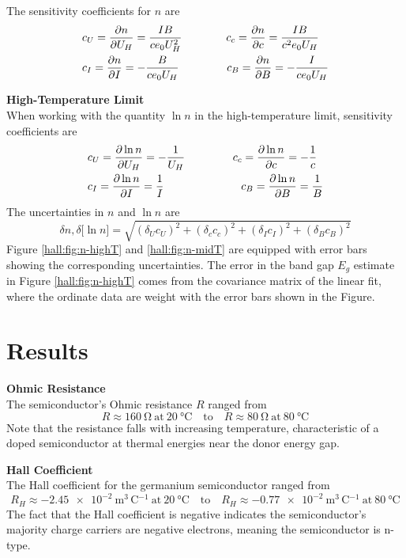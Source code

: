\documentclass[11pt, a4paper]{article}
\begin{document}
\vspace{2mm}
The sensitivity coefficients for $ n $ are
\begin{align*}
	&c_{U} = \pdv{n}{U_{H}} = \frac{IB}{ce_{0}U_{H}^{2}} \qquad \qquad c_{c} = \pdv{n}{c} = \frac{IB}{c^{2}e_{0}U_{H}}\\
	&c_{I} = \pdv{n}{I} = -\frac{B}{ce_{0}U_{H}} \qquad \qquad \ c_{B} = \pdv{n}{B} = -\frac{I}{ce_{0}U_{H}}
\end{align*}


\vspace{2mm}
\textbf{High-Temperature Limit} \\
When working with the quantity $ \ln n $ in the high-temperature limit, sensitivity coefficients are
\begin{align*}
	&c_{U} = \pdv{\ln n}{U_{H}} = -\frac{1}{U_{H}} \qquad \qquad \ c_{c} = \pdv{\ln n}{c} = -\frac{1}{c}\\
	&c_{I} = \pdv{\ln n}{I} = \frac{1}{I} \qquad \qquad \qquad \quad c_{B} = \pdv{\ln n}{B} = \frac{1}{B}
\end{align*}
The uncertainties in $ n $ and $ \ln n $ are
\begin{equation*}
	\delta n, \delta \big[\ln n\big] = \sqrt{(\delta_{U}c_{U})^{2} + (\delta_{c}c_{c})^{2} + (\delta_{I}c_{I})^{2} + (\delta_{B}c_{B})^{2}}
\end{equation*}
Figure \ref{hall:fig:n-highT} and \ref{hall:fig:n-midT} are equipped with error bars showing the corresponding uncertainties. The error in the band gap $ E_{g} $ estimate in Figure \ref{hall:fig:n-highT} comes from the covariance matrix of the linear fit, where the ordinate data are weight with the error bars shown in the Figure.
		
\section{Results}
\textbf{Ohmic Resistance}\\
The semiconductor's Ohmic resistance $ R $ ranged from
\begin{equation*}
	R \approx \SI{160}{\ohm} \ \text{at} \ \SI{20}{\degreeCelsius} \quad \text{to} \quad R \approx \SI{80}{\ohm} \ \text{at} \ \SI{80}{\degreeCelsius}
\end{equation*}
Note that the resistance falls with increasing temperature, characteristic of a doped semiconductor at thermal energies near the donor energy gap.

\vspace{2mm}
\textbf{Hall Coefficient}\\
The Hall coefficient for the germanium semiconductor ranged from 
\begin{equation*}
	R_{H} \approx \SI{-2.45e-2}{\meter^{3}\, \coulomb^{-1}} \ \text{at} \ \SI{20}{\degreeCelsius} \quad \text{to} \quad R_{H} \approx \SI{-0.77e-2}{\meter^{3}\, \coulomb^{-1}} \ \text{at} \ \SI{80}{\degreeCelsius}
\end{equation*}
The fact that the Hall coefficient is negative indicates the semiconductor's majority charge carriers are negative electrons, meaning the semiconductor is n-type.
\end{document}
